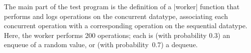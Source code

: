 
\begin{slide}

The main part of the test program is the definition of a |worker| function
that performs and logs operations on the concurrent datatype, associating each
concurrent operation with a corresponding operation on the sequential
datatype.  Here, the worker performs 200 operations; each is (with probability
0.3) an enqueue of a random value, or (with probability~0.7) a dequeue.
\end{slide}


